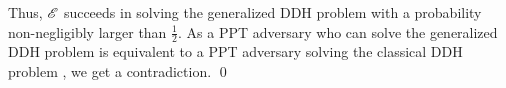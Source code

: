  Thus, $\mathscr{E}$ succeeds in solving the generalized DDH problem with a probability non-negligibly larger than $\frac{1}{2}$. As a \textsf{PPT} adversary who can solve the generalized DDH problem is equivalent to a \textsf{PPT} adversary solving the classical DDH problem \cite{Bao2003}, we get a contradiction. \hfill{\small \qed}
  